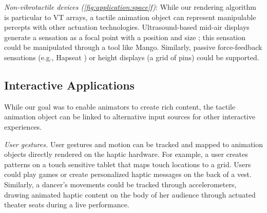 \emph{Non-vibrotactile devices (\autoref{fig:application:space}f)}:
While our rendering algorithm is particular to VT arrays, a tactile animation object can represent manipulable percepts with other actuation technologies.
Ultrasound-based mid-air displays generate a sensation as a focal point with a position and size \cite{Wilson2014}; this sensation could be manipulated through a tool like Mango.
Similarly, passive force-feedback sensations (e.g., Hapseat \cite{Danieau2012a}) or height displays (a grid of pins) could be supported.



\subsection{Interactive Applications}
While our goal was to enable animators to create rich content, the tactile animation object can be linked to alternative input sources for other interactive experiences.

\emph{User gestures.}
User gestures and motion can be tracked and mapped to animation objects directly rendered on the haptic hardware.
For example, a user creates patterns on a touch sensitive tablet that maps touch locations to a grid.
Users could play games or create personalized haptic messages on the back of a vest.
Similarly, a dancer's movements could be tracked through accelerometers, drawing animated haptic content on the body of her audience through actuated theater seats during a live performance.

